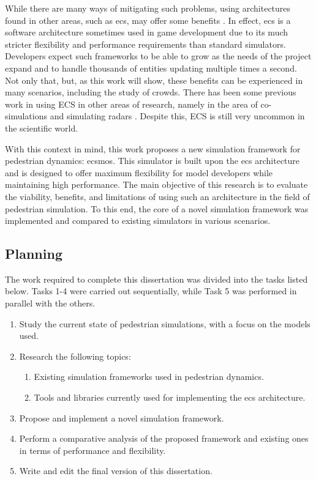 \documentclass[twoside, 11pt]{article}
\begin{document}
While there are many ways of mitigating such problems, using architectures found in other areas, such as \gls{ecs}, may offer some benefits \cite{ecs}. In effect, \gls{ecs} is a software architecture sometimes used in game development due to its much stricter flexibility and performance requirements than standard simulators. Developers expect such frameworks to be able to grow as the needs of the project expand and to handle thousands of entities updating multiple times a second. Not only that, but, as this work will show, these benefits can be experienced in many scenarios, including the study of crowds.  There has been some previous work in using ECS in other areas of research, namely in the area of co-simulations \cite{HATLEDAL2021102243} and simulating radars \cite{satelite}. Despite this, ECS is still very uncommon in the scientific world.

With this context in mind, this work proposes a new simulation framework for pedestrian dynamics: \gls{ecsmos}. This simulator is built upon the \gls{ecs} architecture and is designed to offer maximum flexibility for model developers while maintaining high performance. The main objective of this research is to evaluate the viability, benefits, and limitations of using such an architecture in the field of pedestrian simulation. To this end, the core of a novel simulation framework was implemented and compared to existing simulators in various scenarios.

\subsection{Planning}

The work required to complete this dissertation was divided into the tasks listed below. Tasks 1-4 were carried out sequentially, while Task 5 was performed in parallel with the others.

\begin{enumerate}
  \item Study the current state of pedestrian simulations, with a focus on the models used.
  \item Research the following topics:
  \begin{enumerate}
    \item Existing simulation frameworks used in pedestrian dynamics.
    \item Tools and libraries currently used for implementing the \gls{ecs} architecture.
  \end{enumerate}
  \item Propose and implement a novel simulation framework.
  \item Perform a comparative analysis of the proposed framework and existing ones in terms of performance and flexibility.
  \item Write and edit the final version of this dissertation.
\end{enumerate}
\end{document}
